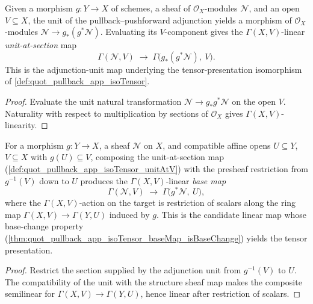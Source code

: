 \begin{definition}\leanok
  \label{def:quot_pullback_app_isoTensor_unitAtV}
  Given a morphism \(g : Y \to X\) of schemes, a sheaf of
  \(\mathcal{O}_X\)-modules \(\mathcal{N}\), and an open \(V \subseteq X\),
  the unit of the pullback--pushforward adjunction yields a morphism of
  \(\mathcal{O}_X\)-modules \(\mathcal{N} \to g_*(g^* \mathcal{N})\).
  Evaluating its \(V\)-component gives the \(\Gamma(X, V)\)-linear
  \emph{unit-at-section} map
  \[
    \Gamma(\mathcal{N}, V)
    \;\longrightarrow\;
    \Gamma\bigl(g_*(g^* \mathcal{N}),\ V\bigr).
  \]
  This is the adjunction-unit map underlying the tensor-presentation
  isomorphism of \cref{def:quot_pullback_app_isoTensor}.
\end{definition}
\begin{proof}
  Evaluate the unit natural transformation
  \(\mathcal N\to g_*g^*\mathcal N\) on the open \(V\). Naturality with
  respect to multiplication by sections of \(\mathcal O_X\) gives
  \(\Gamma(X,V)\)-linearity.
\end{proof}

\begin{definition}\leanok
  \label{def:quot_pullback_app_isoTensor_baseMap}
  For a morphism \(g : Y \to X\), a sheaf \(\mathcal{N}\) on \(X\), and
  compatible affine opens \(U \subseteq Y\), \(V \subseteq X\) with
  \(g(U) \subseteq V\), composing the unit-at-section map
  (\cref{def:quot_pullback_app_isoTensor_unitAtV}) with the presheaf
  restriction from \(g^{-1}(V)\) down to \(U\) produces the
  \(\Gamma(X, V)\)-linear \emph{base map}
  \[
    \Gamma(\mathcal{N}, V)
    \;\longrightarrow\;
    \Gamma\bigl(g^* \mathcal{N},\ U\bigr),
  \]
  where the \(\Gamma(X, V)\)-action on the target is restriction of scalars
  along the ring map \(\Gamma(X, V) \to \Gamma(Y, U)\) induced by \(g\). This
  is the candidate linear map whose base-change property
  (\cref{thm:quot_pullback_app_isoTensor_baseMap_isBaseChange}) yields the
  tensor presentation.
\end{definition}
\begin{proof}
  Restrict the section supplied by the adjunction unit from
  \(g^{-1}(V)\) to \(U\). The compatibility of the unit with the structure
  sheaf map makes the composite semilinear for
  \(\Gamma(X,V)\to\Gamma(Y,U)\), hence linear after restriction of scalars.
\end{proof}

